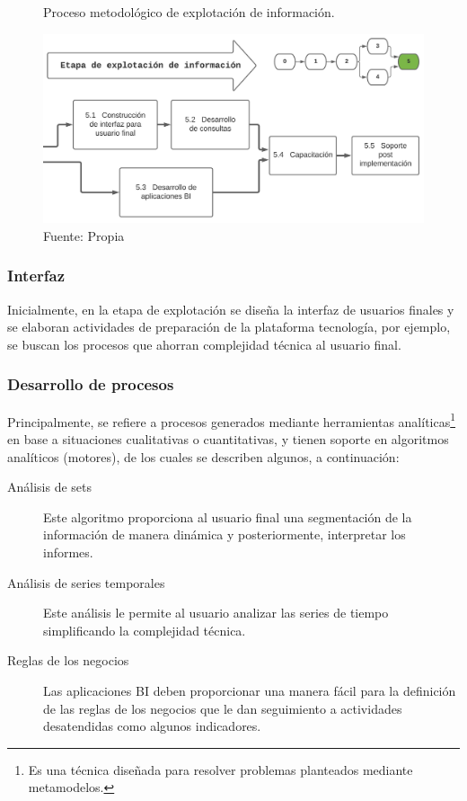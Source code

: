 \documentclass[12pt,jou]{apa7}
\begin{document}
\begin{figure}[h]
\caption{Proceso metodológico de explotación de información. }
\centering
\includegraphics[width=1\linewidth]{Figuras/etapa5}
\caption*{ Fuente: Propia}
\label{fig: etapa5}
\end{figure}

\subsubsection{Interfaz} 
Inicialmente, en la etapa de explotación se diseña la interfaz de usuarios finales y se elaboran actividades de preparación de la plataforma tecnología, por ejemplo, se buscan los procesos que ahorran complejidad técnica al usuario final.

\subsubsection{Desarrollo de procesos}
Principalmente, se refiere a procesos generados mediante herramientas analíticas\footnote{Es una técnica diseñada para resolver problemas planteados mediante metamodelos.} en base a situaciones cualitativas o cuantitativas, y tienen soporte en algoritmos analíticos (motores), de los cuales se describen algunos, a continuación:

\begin{description}
	
\item[Análisis de sets]
Este algoritmo proporciona al usuario final una segmentación de la información de manera dinámica y posteriormente, interpretar los informes. 
	
\item[Análisis de series temporales] 
Este análisis le permite al usuario analizar las series de tiempo simplificando
la complejidad técnica.
	
\item[Reglas de los negocios]
Las aplicaciones BI deben proporcionar una manera fácil para la definición de las reglas de los negocios que le dan seguimiento a actividades desatendidas como algunos indicadores.
\end{description}
\end{document}
